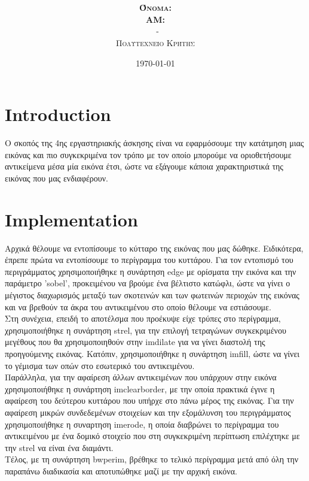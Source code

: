 \documentclass{article}
\title{\underline{\textbf{\assignmentNumber}}}
\author{\textsc{\textbf{Όνομα:}}  \studentName\\
		\textsc{\textbf{ΑΜ:}}  \studentNumber\\
		\course \ - \courseName\\ 
		\textsc{Πολυτεχνείο Κρήτης}
}
\date{\today}
\begin{document}
	\maketitle

\section*{Introduction}
	Ο σκοπός της 4ης εργαστηριακής άσκησης είναι να εφαρμόσουμε την κατάτμηση μιας εικόνας και πιο συγκεκριμένα τον τρόπο με τον οποίο μπορούμε να οριοθετήσουμε αντικείμενα μέσα μία εικόνα έτσι, ώστε να εξάγουμε κάποια χαρακτηριστικά της εικόνας που μας ενδιαφέρουν.

\section*{Implementation}
	Αρχικά θέλουμε να εντοπίσουμε το κύτταρο της εικόνας που μας δώθηκε. Ειδικότερα, έπρεπε πρώτα να εντοπίσουμε το περίγραμμα του κυττάρου. Για τον εντοπισμό του περιγράμματος χρησιμοποιήθηκε η συνάρτηση edge με ορίσματα την εικόνα και την παράμετρο 'sobel', προκειμένου να βρούμε ένα βέλτιστο κατώφλι, ώστε να γίνει ο μέγιστος διαχωρισμός μεταξύ των σκοτεινών και των φωτεινών περιοχών της εικόνας και να βρεθούν τα άκρα του αντικειμένου στο οποίο θέλουμε να εστιάσουμε.\\
	
	\noindent
	Στη συνέχεια, επειδή το αποτέλσμα που προέκυψε είχε τρύπες στο περίγραμμα, χρησιμοποιήθηκε η συνάρτηση strel, για την επιλογή τετραγώνων συγκεκριμένου μεγέθους που θα χρησιμοποιηθούν στην imdilate για να γίνει διαστολή της προηγούμενης εικόνας. Kατόπιν, χρησιμοποιήθηκε η συνάρτηση imfill, ώστε να γίνει το γέμισμα των οπών στο εσωτερικό του αντικειμένου.\\
	
	\noindent
	Παράλληλα, για την αφαίρεση άλλων αντικειμένων που υπάρχουν στην εικόνα χρησιμοποιήθηκε η συνάρτηση imclearborder, με την οποία πρακτικά έγινε η αφαίρεση του δεύτερου κυττάρου που υπήρχε στο πάνω μέρος της εικόνας. Για την αφαίρεση μικρών συνδεδεμένων στοιχείων και την εξομάλυνση του περιγράμματος χρησιμοποιήθηκε η συναρτηση imerode, η οποία διαβρώνει το περίγραμμα του αντικειμένου με ένα δομικό στοιχείο που στη συγκεκριμένη περίπτωση επιλέχτηκε με την strel να είναι ένα διαμάντι.\\
	
	\noindent
	Τέλος, με τη συνάρτηση bwperim, βρέθηκε το τελικό περίγραμμα μετά από όλη την παραπάνω διαδικασία και αποτυπώθηκε μαζί με την αρχική εικόνα.
	
\end{document}
